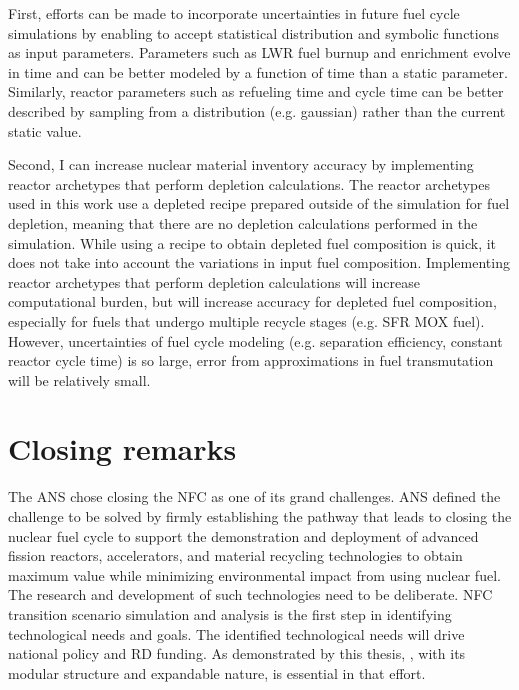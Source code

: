 First, efforts can be made to incorporate
uncertainties in future fuel cycle simulations by enabling
\Cyclus to accept statistical distribution and symbolic
functions as input parameters. Parameters such as \gls{LWR} fuel
burnup and enrichment evolve in time and can be better modeled
by a function of time than a static parameter. Similarly, reactor parameters
such as refueling time and cycle time can be better described by sampling
from a distribution (e.g. gaussian) rather than the current static
value.

Second, I can increase nuclear material inventory accuracy by
implementing reactor archetypes that perform depletion calculations.
The reactor archetypes used in this work use a depleted recipe
prepared outside of the simulation for fuel depletion, meaning
that there are no depletion calculations performed in the simulation.
While using a recipe to obtain depleted fuel composition is quick,
it does not take into account the variations in input fuel composition.
Implementing reactor archetypes that perform depletion calculations will
increase computational burden, but will increase accuracy for depleted
fuel composition, especially for fuels that undergo multiple recycle
stages (e.g. \gls{SFR} \gls{MOX} fuel). However, uncertainties
of fuel cycle modeling (e.g. separation efficiency, constant reactor
cycle time) is so large, error from
approximations in fuel transmutation will be relatively small.


\section{Closing remarks}
The \gls{ANS} chose closing the \gls{NFC} as one of its grand challenges. \gls{ANS}
defined the challenge to be solved by firmly establishing the pathway that leads to closing
the nuclear fuel cycle to support the demonstration and deployment of
advanced fission reactors, accelerators, and material recycling technologies
to obtain maximum value while minimizing environmental impact 
from using nuclear fuel. The research and development of such technologies
need to be deliberate. \gls{NFC} transition scenario simulation and 
analysis is the first step in identifying technological needs
and goals. The identified technological needs will drive national
policy and \gls{RD} funding. As demonstrated by this thesis, \Cyclus, with its modular structure and expandable nature, is essential in that effort.

